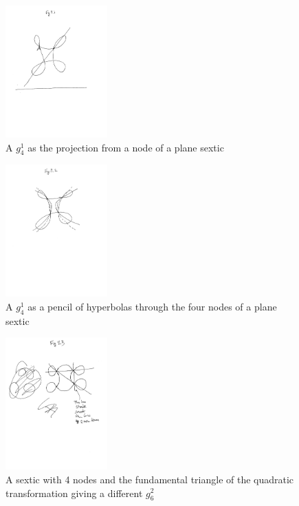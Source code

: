 \begin{figure}
\begin{center}
\centerline {\includegraphics[height=2in]{"Fig11.1.pdf"}}
\caption{A $g^1_4$ as the projection from a node of a plane sextic }
\label{default}
\end{center}
\end{figure}

\begin{figure}
\begin{center}
\centerline {\includegraphics[height=2in]{"Fig11.2.pdf"}}
\caption{A $g^1_4$ as a pencil of hyperbolas through the four nodes of a plane sextic}
\label{default}
\end{center}
\end{figure}
 
 
\begin{figure}
\begin{center}
\centerline {\includegraphics[height=2in]{"Fig11.3.pdf"}}
\caption{A sextic with 4 nodes and the fundamental triangle of the quadratic transformation giving
a different $g^{2}_{6}$}
\label{default}
\end{center}
\end{figure}


